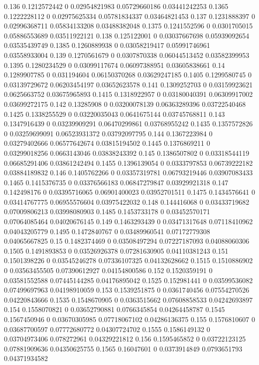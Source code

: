 {0.136 0.1212572442 0 0.02954821983 0.05729660186 0.03441242253
0.1365 0.1222228112 0 0.02975625334 0.05781834337 0.03464821453
0.137 0.1231888397 0 0.02996368711 0.05834133208 0.03488382048
0.1375 0.1241552596 0 0.0301705015 0.05886553689 0.03511922121
0.138 0.125122001 0 0.03037667698 0.05939092654 0.03535439749
0.1385 0.1260889938 0 0.03058219417 0.05991746961 0.03558933004
0.139 0.1270561679 0 0.0307870338 0.06044513452 0.03582399953
0.1395 0.1280234529 0 0.03099117674 0.06097388951 0.03605838661
0.14 0.1289907785 0 0.031194604 0.06150370268 0.03629247185
0.1405 0.1299580745 0 0.03139729672 0.06203454197 0.03652623578
0.141 0.1309252703 0 0.03159923621 0.0625663752 0.03675965893
0.1415 0.1318922957 0 0.03180040391 0.06309917002 0.03699272175
0.142 0.13285908 0 0.03200078139 0.06363289396 0.03722540468
0.1425 0.1338255529 0 0.03220035043 0.0641675144 0.03745768811
0.143 0.1347916439 0 0.03239909291 0.06470299861 0.03768955242
0.1435 0.1357572826 0 0.03259699091 0.06523931372 0.03792097795
0.144 0.1367223984 0 0.03279402666 0.06577642674 0.03815194502
0.1445 0.1376869211 0 0.03299018256 0.0663143046 0.03838243392
0.145 0.1386507802 0 0.03318544119 0.06685291406 0.03861242494
0.1455 0.1396139054 0 0.0333797853 0.06739222182 0.03884189832
0.146 0.1405762266 0 0.03357319781 0.06793219446 0.03907083433
0.1465 0.1415376735 0 0.03376566183 0.06847279847 0.03929921318
0.147 0.142498176 0 0.03395716065 0.06901400023 0.03952701511
0.1475 0.1434576641 0 0.03414767775 0.06955576604 0.03975422032
0.148 0.144416068 0 0.03433719682 0.07009806213 0.03998080903
0.1485 0.1453733178 0 0.03452570171 0.07064085464 0.04020676145
0.149 0.1463293439 0 0.03471317648 0.07118410962 0.04043205779
0.1495 0.1472840767 0 0.03489960541 0.07172779308 0.04065667825
0.15 0.1482374469 0 0.03508497294 0.07227187093 0.04088060306
0.1505 0.1491893853 0 0.03526926378 0.07281630905 0.04110381243
0.151 0.1501398226 0 0.03545246278 0.07336107325 0.04132628662
0.1515 0.1510886902 0 0.03563455505 0.07390612927 0.04154800586
0.152 0.1520359191 0 0.03581552588 0.07445144285 0.04176895042
0.1525 0.152981441 0 0.03599536082 0.07499697963 0.04198910059
0.153 0.1539251875 0 0.0361740456 0.07554270526 0.04220843666
0.1535 0.1548670905 0 0.0363515662 0.07608858533 0.04242693897
0.154 0.1558070821 0 0.03652790881 0.0766345854 0.04264458787
0.1545 0.1567450946 0 0.03670305985 0.07718067102 0.04286136375
0.155 0.1576810607 0 0.03687700597 0.07772680772 0.04307724702
0.1555 0.1586149132 0 0.03704973406 0.078272961 0.04329221812
0.156 0.1595465852 0 0.03722123125 0.07881909636 0.04350625755
0.1565 0.16047601 0 0.0373914849 0.0793651793 0.04371934582
}
